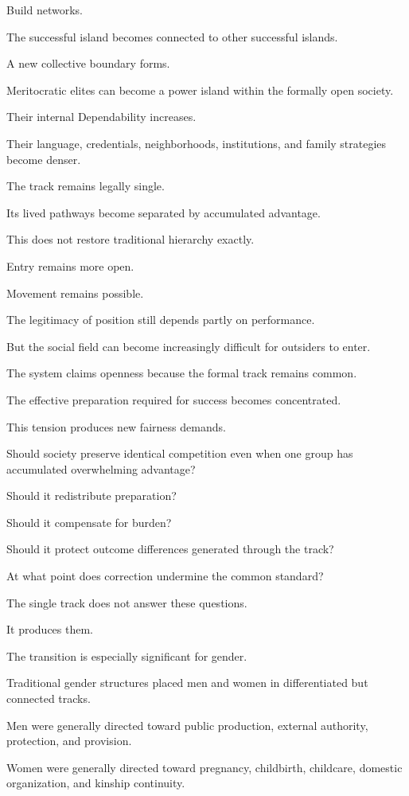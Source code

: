 Build networks.

The successful island becomes connected to other successful islands.

A new collective boundary forms.

Meritocratic elites can become a power island within the formally open society.

Their internal Dependability increases.

Their language, credentials, neighborhoods, institutions, and family strategies become denser.

The track remains legally single.

Its lived pathways become separated by accumulated advantage.

This does not restore traditional hierarchy exactly.

Entry remains more open.

Movement remains possible.

The legitimacy of position still depends partly on performance.

But the social field can become increasingly difficult for outsiders to enter.

The system claims openness because the formal track remains common.

The effective preparation required for success becomes concentrated.

This tension produces new fairness demands.

Should society preserve identical competition even when one group has accumulated overwhelming advantage?

Should it redistribute preparation?

Should it compensate for burden?

Should it protect outcome differences generated through the track?

At what point does correction undermine the common standard?

The single track does not answer these questions.

It produces them.

The transition is especially significant for gender.

Traditional gender structures placed men and women in differentiated but connected tracks.

Men were generally directed toward public production, external authority, protection, and provision.

Women were generally directed toward pregnancy, childbirth, childcare, domestic organization, and kinship continuity.

